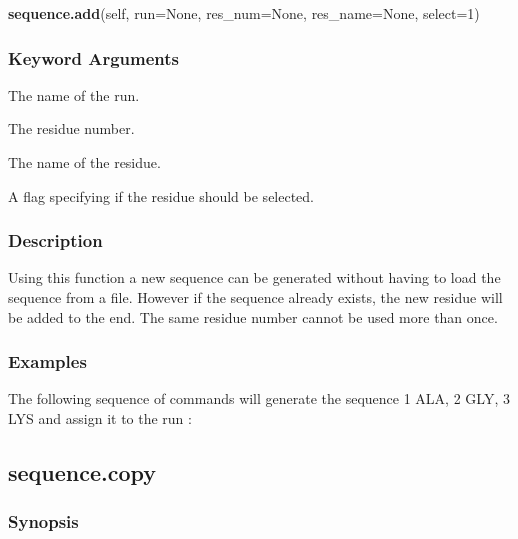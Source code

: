 \textsf{\textbf{sequence.add}(self, run=None, res\_num=None, res\_name=None, select=1)}


\subsubsection{Keyword Arguments}

  The name of the run. 

  The residue number. 

  The name of the residue. 

  A flag specifying if the residue should be selected. 




\subsubsection{Description}

Using this function a new sequence can be generated without having to load the sequence from a file.  However if the sequence already exists, the new residue will be added to the end. The same residue number cannot be used more than once.



\subsubsection{Examples}

The following sequence of commands will generate the sequence 1 ALA, 2 GLY, 3 LYS and assign it to the run :








\newpage

\subsection{sequence.copy}


\subsubsection{Synopsis}

